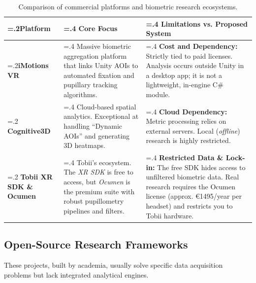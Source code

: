 \documentclass[12pt,a4paper]{article}
\begin{document}
\begin{table}[H]
    \centering
    \small
    \begin{tabularx}{\textwidth}{@{} >{\hsize=.2\hsize}X >{\hsize=.4\hsize}X >{\hsize=.4\hsize}X @{}}
        \toprule
        \textbf{Platform}                                   & \textbf{Core Focus}                                                                                                                                & \textbf{Limitations vs. Proposed System}                                                                                                                                                                     \\
        \midrule
        \textbf{iMotions VR} \cite{imotions}                & Massive biometric aggregation platform that links Unity AOIs to automated fixation and pupillary tracking algorithms.                              & \textbf{Cost and Dependency:} Strictly tied to paid licenses. Analysis occurs outside Unity in a desktop app; it is not a lightweight, in-engine C\# module.                                                 \\
        \addlinespace
        \textbf{Cognitive3D} \cite{cognitive3d}             & Cloud-based spatial analytics. Exceptional at handling ``Dynamic AOIs'' and generating 3D heatmaps.                                                & \textbf{Cloud Dependency:} Metric processing relies on external servers. Local (\textit{offline}) research is highly restricted.                                                                             \\
        \addlinespace
        \textbf{Tobii XR SDK \& Ocumen} \cite{tobii_ocumen} & Tobii's ecosystem. The \textit{XR SDK} is free to access, but \textit{Ocumen} is the premium suite with robust pupillometry pipelines and filters. & \textbf{Restricted Data \& Lock-in:} The free SDK hides access to unfiltered biometric data. Real research requires the Ocumen license (approx. €1495/year per headset) and restricts you to Tobii hardware. \\
        \bottomrule
    \end{tabularx}
    \caption{Comparison of commercial platforms and biometric research ecosystems.}
\end{table}

\subsection{Open-Source Research Frameworks}
These projects, built by academia, usually solve specific data acquisition problems but lack integrated analytical engines.
\end{document}
